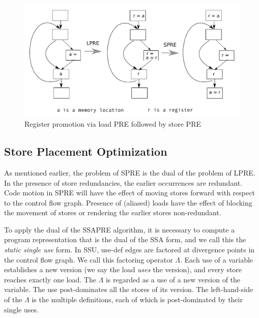 \begin{figure}
\centering
\includegraphics[scale=0.55]{fig-promotion-example.pdf}
\caption{Register promotion via load PRE followed by store PRE}
\label{fig: promotion-example}
\end{figure}

\subsection{Store Placement Optimization}

As mentioned earlier, the problem of SPRE is the dual of the problem of LPRE.
In the presence of store redundancies, the earlier occurrences are redundant.
Code motion in SPRE will have the effect of moving stores forward with respect 
to the control flow graph.  Presence of (aliased) loads have the effect of
blocking the movement of stores or rendering the earlier stores non-redundant.

To apply the dual of the SSAPRE algorithm, it is necessary to compute a program
representation that is the dual of the SSA form, and we call this the 
\emph{static single use} form.  In SSU, use-def edges are factored at
divergence points in the control flow graph.  We call this factoring operator
$\Lambda$.  Each use of a variable establishes a new version (we say the load 
\emph{uses} the version), and every store reaches exactly one load.   The
$\Lambda$ is regarded as a use of a new version of the variable.  The use
post-dominates all the stores of its version.  The left-hand-side of the
$\Lambda$ is the multiple definitions, each of which is post-dominated by their
single uses.


